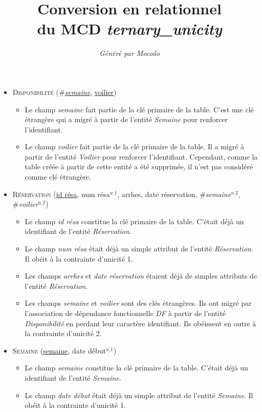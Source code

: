 \documentclass[a4paper]{article}
\title{Conversion en relationnel\\du MCD \emph{ternary\_unicity}}
\author{\emph{Généré par Mocodo}}
\newcommand{\relat}[1]{\textsc{#1}}
\newcommand{\attr}[1]{#1}
\newcommand{\prim}[1]{\uline{#1}}
\newcommand{\foreign}[1]{\#\textsl{#1}}
\begin{document}
\maketitle

\begin{itemize}
  \item \relat{Disponibilité} (\foreign{\prim{semaine}}, \prim{voilier})
  \begin{itemize}
    \item Le champ \emph{semaine} fait partie de la clé primaire de la table. C'est une clé étrangère qui a migré à partir de l'entité \emph{Semaine} pour renforcer l'identifiant.
    \item Le champ \emph{voilier} fait partie de la clé primaire de la table. Il a migré à partir de l'entité \emph{Voilier} pour renforcer l'identifiant. Cependant, comme la table créée à partir de cette entité a été supprimée, il n'est pas considéré comme clé étrangère.
  \end{itemize}

  \item \relat{Réservation} (\prim{id résa}, \attr{num résa}$^{u\_1}$, \attr{arrhes}, \attr{date réservation}, \foreign{semaine}$^{u\_2}$, \foreign{voilier}$^{u\_2}$)
  \begin{itemize}
    \item Le champ \emph{id résa} constitue la clé primaire de la table. C'était déjà un identifiant de l'entité \emph{Réservation}.
    \item Le champ \emph{num résa} était déjà un simple attribut de l'entité \emph{Réservation}. Il obéit à la contrainte d'unicité 1.
    \item Les champs \emph{arrhes} et \emph{date réservation} étaient déjà de simples attributs de l'entité \emph{Réservation}.
    \item Les champs \emph{semaine} et \emph{voilier} sont des clés étrangères. Ils ont migré par l'association de dépendance fonctionnelle \emph{DF} à partir de l'entité \emph{Disponibilité} en perdant leur caractère identifiant. Ils obéissent en outre à la contrainte d'unicité 2.
  \end{itemize}

  \item \relat{Semaine} (\prim{semaine}, \attr{date début}$^{u\_1}$)
  \begin{itemize}
    \item Le champ \emph{semaine} constitue la clé primaire de la table. C'était déjà un identifiant de l'entité \emph{Semaine}.
    \item Le champ \emph{date début} était déjà un simple attribut de l'entité \emph{Semaine}. Il obéit à la contrainte d'unicité 1.
  \end{itemize}

\end{itemize}
\end{document}
